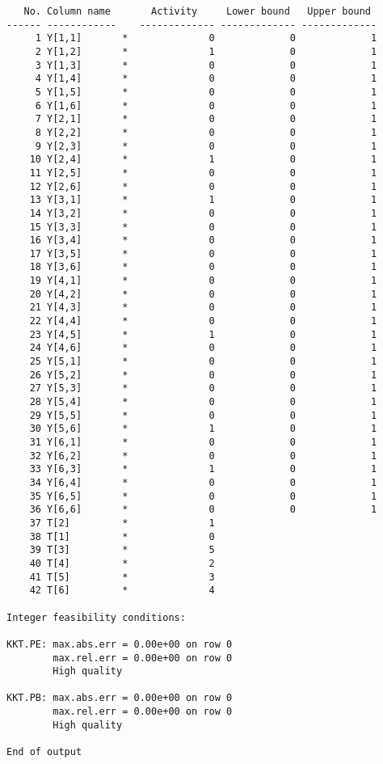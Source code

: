 \begin{lstlisting}
   No. Column name       Activity     Lower bound   Upper bound
------ ------------    ------------- ------------- -------------
     1 Y[1,1]       *              0             0             1
     2 Y[1,2]       *              1             0             1
     3 Y[1,3]       *              0             0             1
     4 Y[1,4]       *              0             0             1
     5 Y[1,5]       *              0             0             1
     6 Y[1,6]       *              0             0             1
     7 Y[2,1]       *              0             0             1
     8 Y[2,2]       *              0             0             1
     9 Y[2,3]       *              0             0             1
    10 Y[2,4]       *              1             0             1
    11 Y[2,5]       *              0             0             1
    12 Y[2,6]       *              0             0             1
    13 Y[3,1]       *              1             0             1
    14 Y[3,2]       *              0             0             1
    15 Y[3,3]       *              0             0             1
    16 Y[3,4]       *              0             0             1
    17 Y[3,5]       *              0             0             1
    18 Y[3,6]       *              0             0             1
    19 Y[4,1]       *              0             0             1
    20 Y[4,2]       *              0             0             1
    21 Y[4,3]       *              0             0             1
    22 Y[4,4]       *              0             0             1
    23 Y[4,5]       *              1             0             1
    24 Y[4,6]       *              0             0             1
    25 Y[5,1]       *              0             0             1
    26 Y[5,2]       *              0             0             1
    27 Y[5,3]       *              0             0             1
    28 Y[5,4]       *              0             0             1
    29 Y[5,5]       *              0             0             1
    30 Y[5,6]       *              1             0             1
    31 Y[6,1]       *              0             0             1
    32 Y[6,2]       *              0             0             1
    33 Y[6,3]       *              1             0             1
    34 Y[6,4]       *              0             0             1
    35 Y[6,5]       *              0             0             1
    36 Y[6,6]       *              0             0             1
    37 T[2]         *              1
    38 T[1]         *              0
    39 T[3]         *              5
    40 T[4]         *              2
    41 T[5]         *              3
    42 T[6]         *              4

Integer feasibility conditions:

KKT.PE: max.abs.err = 0.00e+00 on row 0
        max.rel.err = 0.00e+00 on row 0
        High quality

KKT.PB: max.abs.err = 0.00e+00 on row 0
        max.rel.err = 0.00e+00 on row 0
        High quality

End of output

\end{lstlisting}

